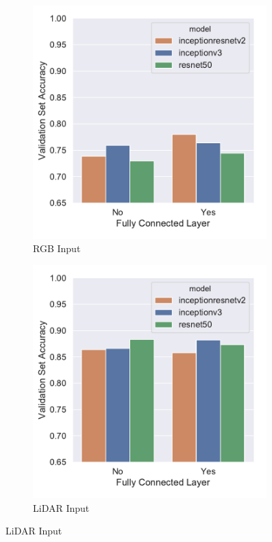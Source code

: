 \begin{figure}[ht]
    \centering
    \begin{subfigure}[t]{0.45\columnwidth}
        \centering
        \includegraphics[width=0.99\textwidth]{chapter_4_roofshape/imgs/val_data_set_cnn_rgb.pdf}
        \caption{RGB Input}
        \label{fig:rgb_val}
    \end{subfigure}%
    \hfill
    \begin{subfigure}[t]{0.45\columnwidth}
        \centering
        \includegraphics[width=0.99\textwidth]{chapter_4_roofshape/imgs/val_data_set_cnn_lidar.pdf}
        \caption{LiDAR Input}
        \label{fig:lidar_val}
    \end{subfigure}


\end{figure}
